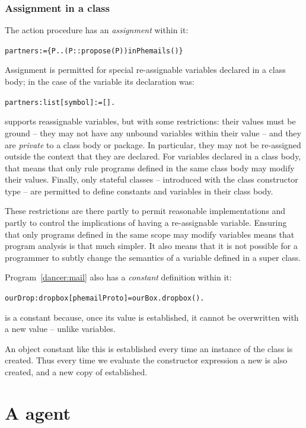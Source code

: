 \subsubsection{Assignment in a class}
The  action procedure has an \emph{assignment} within it:
\begin{alltt}
partners := \{ P..(P::propose(P)) in Phemails() \}
\end{alltt}
Assignment is permitted for special re-assignable variables declared in a class body; in the case of the  variable its declaration was:
\begin{alltt}
partners:list[symbol] := [].
\end{alltt}
\go supports reassignable variables, but with some restrictions: their values must be ground -- they may not have any unbound variables within their value -- and they are \emph{private} to a class body or package. In particular, they may not be re-assigned outside the context that they are declared. For variables declared in a class body, that means that only rule programs defined in the same class body may modify their values. Finally, only stateful classes -- introduced with the \sconarrow{} class constructor type -- are permitted to define constants and variables in their class body.

These restrictions are there partly to permit reasonable implementations and partly to control the implications of having a re-assignable variable. Ensuring that only programs defined in the same scope may modify variables means that program analysis is that much simpler. It also means that it is not possible for a programmer to subtly change the semantics of a variable defined in a super class.

Program~\vref{dancer:mail} also has a \emph{constant} definition within it:
\begin{alltt}
  ourDrop:dropbox[phemailProto] = ourBox.dropbox().
\end{alltt}
 is a constant because, once its value is established, it cannot be overwritten with a new value -- unlike variables. 

An object constant like this is established every time an instance of the \mail class is created. Thus every time we evaluate the constructor expression  a new  is also created, and a new copy of  established.

\section{A \phemail agent}
\label{dance:phemail}

